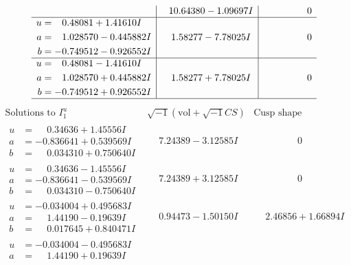 \documentclass[1p]{elsarticle_modified}
\theoremstyle{definition}
\newcommand{\I}{\sqrt{-1}}
\begin{document}
$$\begin{array}{c|c|c}
 & \phantom{-}10.64380 - 1.09697 I & \phantom{-0.000000 } 0 \\ \hline\begin{aligned}
u &= \phantom{-}0.48081 + 1.41610 I \\
a &= \phantom{-}1.028570 - 0.445882 I \\
b &= -0.749512 - 0.926552 I\end{aligned}
 & \phantom{-}1.58277 - 7.78025 I & \phantom{-0.000000 } 0 \\ \hline\begin{aligned}
u &= \phantom{-}0.48081 - 1.41610 I \\
a &= \phantom{-}1.028570 + 0.445882 I \\
b &= -0.749512 + 0.926552 I\end{aligned}
 & \phantom{-}1.58277 + 7.78025 I & \phantom{-0.000000 } 0\\
 \hline 
 \end{array}$$\newpage$$\begin{array}{c|c|c}  
\text{Solutions to }I^u_{1}& \I (\text{vol} + \sqrt{-1}CS) & \text{Cusp shape}\\
 \hline 
\begin{aligned}
u &= \phantom{-}0.34636 + 1.45556 I \\
a &= -0.836641 + 0.539569 I \\
b &= \phantom{-}0.034310 + 0.750640 I\end{aligned}
 & \phantom{-}7.24389 - 3.12585 I & \phantom{-0.000000 } 0 \\ \hline\begin{aligned}
u &= \phantom{-}0.34636 - 1.45556 I \\
a &= -0.836641 - 0.539569 I \\
b &= \phantom{-}0.034310 - 0.750640 I\end{aligned}
 & \phantom{-}7.24389 + 3.12585 I & \phantom{-0.000000 } 0 \\ \hline\begin{aligned}
u &= -0.034004 + 0.495683 I \\
a &= \phantom{-}1.44190 - 0.19639 I \\
b &= \phantom{-}0.017645 + 0.840471 I\end{aligned}
 & \phantom{-}0.94473 - 1.50150 I & \phantom{-}2.46856 + 1.66894 I \\ \hline\begin{aligned}
u &= -0.034004 - 0.495683 I \\
a &= \phantom{-}1.44190 + 0.19639 I \\

\end{aligned}
\end{array}$$
\end{document}
